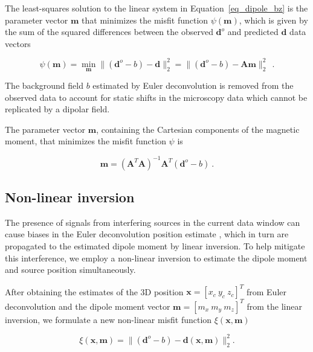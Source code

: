     The least-squares solution to the linear system in  Equation~\ref{eq_dipole_bz} is the parameter vector $\mathbf{m}$ that minimizes the misfit function $\psi(\mathbf{m})$, which is given by the sum of the squared differences between the observed  $\mathbf{d}^o$ and predicted $\mathbf{d}$ data vectors
   
    \begin{equation}
    \label{psi_function}
    \psi(\mathbf{m}) 
    = \min_{\mathbf{m}} \| (\mathbf{d}^o - b) - \mathbf{d} \|_2^2
    = \| (\mathbf{d}^o - b) - \mathbf{A}\mathbf{m} \|_2^2\ 
    \ .
    \end{equation}

    \noindent
    The background field $b$ estimated by Euler deconvolution is removed from the observed data to account for static shifts in the microscopy data which cannot be replicated by a dipolar field.
    
    The parameter vector $\mathbf{m}$, containing the Cartesian components of the magnetic moment, that minimizes the misfit function $\psi$ is

    \begin{equation}
    \label{dipole_moment_solution}
    \mathbf{m} = \left(\mathbf{A}^T \mathbf{A}\right)^{-1} \mathbf{A}^T (\mathbf{d}^o - b)\ .
    \end{equation}

        
\subsection{Non-linear inversion} 

    The presence of signals from interfering sources in the current data window can cause biases in the Euler deconvolution position estimate \citep{Uieda2024}, which in turn are propagated to the estimated dipole moment by linear inversion. 
    To help mitigate this interference, we employ a non-linear inversion to estimate the dipole moment and source position simultaneously. 
    
     After obtaining the estimates of the 3D position $\mathbf{x} = [x_{c}\ y_{c}\ z_{c}]^T$ from Euler deconvolution and the dipole moment vector $\mathbf{m} = [m_{x}\ m_{y}\ m_{z}]^T$ from the linear inversion, we formulate a new non-linear misfit function $\xi(\mathbf{x}, \mathbf{m})$ 
     
    \begin{equation}
    \label{misfit_equation}
    \xi(\mathbf{x}, \mathbf{m}) = 
    \| (\mathbf{d}^o - b) - \mathbf{d}(\mathbf{x}, \mathbf{m}) \|_2^2.
    \end{equation} 

